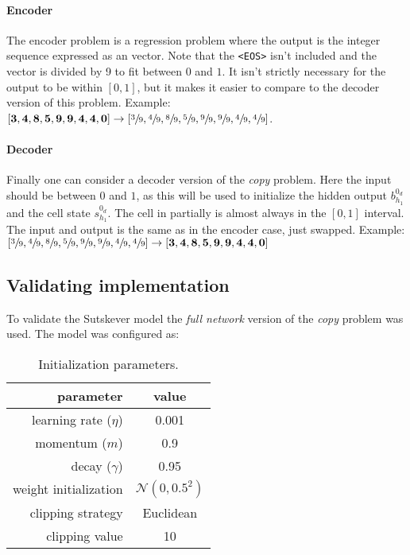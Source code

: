 \paragraph{Encoder} The encoder problem is a regression problem where the output is the integer sequence expressed as an vector. Note that the \texttt{<EOS>} isn't included and the vector is divided by 9 to fit between $0$ and $1$. It isn't strictly necessary for the output to be within $[0, 1]$, but it makes it easier to compare to the decoder version of this problem. Example: $[\mathbf{3}, \mathbf{4}, \mathbf{8}, \mathbf{5}, \mathbf{9}, \mathbf{9}, \mathbf{4}, \mathbf{4}, \mathbf{0}] \rightarrow [\sfrac{3}{9}, \sfrac{4}{9}, \sfrac{8}{9}, \sfrac{5}{9}, \sfrac{9}{9}, \sfrac{9}{9}, \sfrac{4}{9}, \sfrac{4}{9}]$.

\paragraph{Decoder} Finally one can consider a decoder version of the \textit{copy} problem. Here the input should be between $0$ and $1$, as this will be used to initialize the hidden output $b_{h_1}^{0_d}$ and the cell state $s_{h_1}^{0_d}$. The cell in partially is almost always in the $[0, 1]$ interval. The input and output is the same as in the encoder case, just swapped. Example: $[\sfrac{3}{9}, \sfrac{4}{9}, \sfrac{8}{9}, \sfrac{5}{9}, \sfrac{9}{9}, \sfrac{9}{9}, \sfrac{4}{9}, \sfrac{4}{9}] \rightarrow [\mathbf{3}, \mathbf{4}, \mathbf{8}, \mathbf{5}, \mathbf{9}, \mathbf{9}, \mathbf{4}, \mathbf{4}, \mathbf{0}]$

\subsection{Validating implementation}

To validate the Sutskever model the \textit{full network} version of the \textit{copy} problem was used. The model was configured as:

\begin{table}[H]
\centering
\begin{tabular}{r|c}
	parameter & value \\ \hline
	learning rate ($\eta$) & 0.001 \\
	momentum ($m$) & 0.9 \\
	decay ($\gamma$) & 0.95 \\
	weight initialization & $\mathcal{N}(0, 0.5^2)$ \\
	clipping strategy & Euclidean \\
	clipping value & 10
\end{tabular}
\caption{Initialization parameters.}
\end{table}

